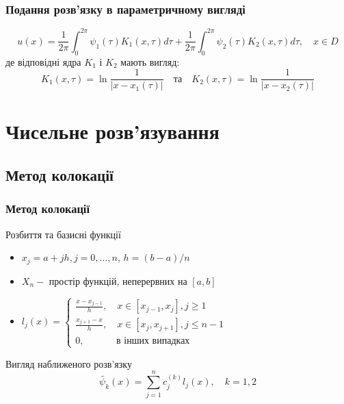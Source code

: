 \documentclass{beamer}
\numberwithin{equation}{section}
\begin{document}
	\begin{frame}
		\frametitle{Подання розв'язку в параметричному вигляді}

		$$
		u(x)=\frac{1}{2 \pi} \int_{0}^{2 \pi} \psi_{1}(\tau) K_{1}(x, \tau) d \tau+\frac{1}{2 \pi} \int_{0}^{2 \pi} \psi_{2}(\tau) K_{2}(x, \tau) d \tau, \quad x \in D
		$$
		де відповідні ядра $K_{1}$ і $K_{2}$ мають вигляд:
		$$
		K_{1}(x, \tau)=\ln \frac{1}{\left|x-x_{1}(\tau)\right|}
		\quad \text{та} \quad 
		K_{2}(x, \tau)=\ln \frac{1}{\left|x-x_{2}(\tau)\right|}
		$$
		
		
	\end{frame}

	\section{Чисельне розв'язування} 

	\subsection{Метод колокації}
	\begin{frame}
		\frametitle{Метод колокації}
		
		\begin{block}{Розбиття та базисні функції}
			\begin{itemize}
			\item $x_{j}=a+j h, j=0, \ldots, n$, $h=(b-a) / n$
			\vspace{0.3cm}
			\item $X_{n}-$ простір функцій, неперервних на $[a, b]$
			\item $l_{j}(x)=\left\{
			\begin{array}{lc}
				\frac{x-x_{j-1}}{h}, \quad x \in\left[x_{j-1}, x_{j}\right], j \geq 1 \\
				\frac{x_{j+1}-x}{h}, \quad x \in\left[x_{j}, x_{j+1}\right], j \leq n-1 \\
				0, \qquad\quad \text { в інших випадках }
			\end{array}\right.$
		
			\end{itemize}
		\end{block}
		
		\begin{block}{Вигляд наближеного розв'язку}
		$$
		\tilde{\psi_k}(x)=\sum_{j=1}^{n} c^{(k)}_{j} l_{j}(x), \quad k = 1, 2
		$$
		\end{block}
		

	\end{frame}
\end{document}
